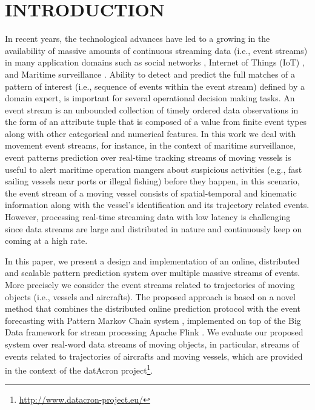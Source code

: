 \section{INTRODUCTION}


In recent years, the technological advances have led to a growing in the availability of massive amounts of continuous streaming data (i.e., event streams) in many application domains such as social networks \cite{mathioudakis2010twittermonitor}, Internet of Things (IoT) \cite{miorandi2012internet}, and Maritime surveillance \cite{patroumpas2015event}. Ability to detect and predict the full matches of a pattern of interest (i.e., sequence of events within the event stream) defined by a domain expert, is important for several operational decision making tasks.
An event stream is an unbounded collection of timely ordered data observations in the form of an attribute tuple that is composed of a value from finite event types along with other categorical and numerical features. In this work we deal with movement event streams, for instance, in the context of maritime surveillance, event patterns prediction over real-time tracking streams of moving vessels is useful to alert maritime operation mangers about suspicious activities (e.g., fast sailing vessels near ports or illegal fishing) before they happen, in this scenario, the event stream of a moving vessel consists of spatial-temporal and kinematic information along with the vessel's identification and its trajectory related events. However, processing real-time streaming data with low latency is challenging since data streams are large and distributed in nature and continuously keep on coming at a high rate. 
\par In this paper, we present a design and implementation of an online, distributed and scalable pattern prediction system over multiple massive streams of events. More precisely we consider the event streams related to trajectories of moving objects (i.e., vessels and aircrafts). The proposed approach is based on a novel method that combines the distributed online prediction protocol \cite{dekel2012optimal,kamp2014communication} with the event forecasting with Pattern Markov Chain system \cite{alevizos2017event}, implemented on top of the Big Data framework for stream processing Apache Flink \cite{Flink}. We evaluate our proposed system over  real-word data streams of moving objects, in particular, streams of events related to trajectories of aircrafts and moving vessels, which are provided in the context of the datAcron project\footnote{\url{http://www.datacron-project.eu/}}.